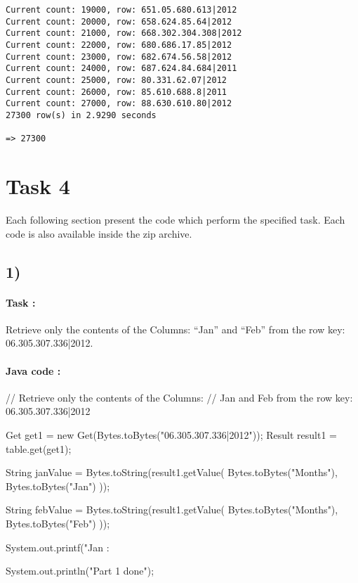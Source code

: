 \documentclass[a4paper,11pt]{report}
\begin{document}
\begin{verbatim}
Current count: 19000, row: 651.05.680.613|2012                                                          
Current count: 20000, row: 658.624.85.64|2012                                                           
Current count: 21000, row: 668.302.304.308|2012                                                         
Current count: 22000, row: 680.686.17.85|2012                                                           
Current count: 23000, row: 682.674.56.58|2012                                                           
Current count: 24000, row: 687.624.84.684|2011                                                          
Current count: 25000, row: 80.331.62.07|2012                                                            
Current count: 26000, row: 85.610.688.8|2011                                                            
Current count: 27000, row: 88.630.610.80|2012                                                           
27300 row(s) in 2.9290 seconds

=> 27300
\end{verbatim}

\newpage

\section*{Task 4}

Each following section present the code which perform the specified task. Each
code is also available inside the zip archive.

\subsection*{1)}

\paragraph{Task : } Retrieve only the contents of the Columns: “Jan” and “Feb” from the row key:
06.305.307.336|2012.

\paragraph{Java code : }

\begin{javacode}
// Retrieve only the contents of the Columns:
// Jan and Feb from the row key: 06.305.307.336|2012

Get get1 = new Get(Bytes.toBytes("06.305.307.336|2012"));
Result result1 = table.get(get1);

String janValue = Bytes.toString(result1.getValue(
    Bytes.toBytes("Months"),
    Bytes.toBytes("Jan")
));

String febValue = Bytes.toString(result1.getValue(
    Bytes.toBytes("Months"),
    Bytes.toBytes("Feb")
));

System.out.printf("Jan : %

System.out.println("Part 1 done");
\end{javacode}
\end{document}
